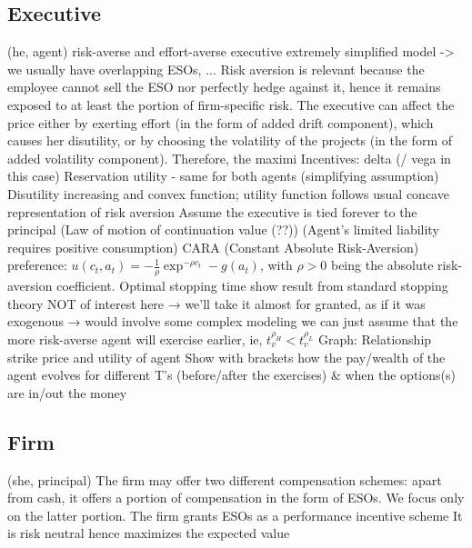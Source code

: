 \subsection{Executive}
(he, agent) risk-averse and effort-averse executive 
extremely simplified model -> we usually have overlapping ESOs, ...
Risk aversion is relevant because the employee cannot sell the ESO nor perfectly hedge against it, hence it remains exposed to at least the portion of firm-specific risk.
The executive can affect the price either by exerting effort (in the form of added drift component), which causes her disutility, or by choosing the volatility of the projects (in the form of added volatility component). Therefore, the maximi
Incentives: delta (/ vega in this case)
Reservation utility - same for both agents (simplifying assumption)
Disutility increasing and convex function; utility function follows usual concave representation of risk aversion
Assume the executive is tied forever to the principal
(Law of motion of continuation value (??))
(Agent's limited liability requires positive consumption)
CARA (Constant Absolute Risk-Aversion) preference: $u(c_t, a_t) = -\frac{1}{\rho} \exp^{-\rho c_t} - g(a_t)$, with $\rho>0$ being the absolute risk-aversion coefficient.
Optimal stopping time 
    show result from standard stopping theory
    NOT of interest here → we'll take it almost for granted, as if it was exogenous → would involve some complex modeling
    we can just assume that the more risk-averse agent will exercise earlier, ie, $t_v^{\rho_H} < t_v^{\rho_L}$
Graph: Relationship strike price and utility of agent
Show with brackets how the pay/wealth of the agent evolves for different T's (before/after the exercises) \& when the options(s) are in/out the money


\subsection{Firm}
(she, principal)
The firm may offer two different compensation schemes: apart from cash, it offers a portion of compensation in the form of ESOs. We focus only on the latter portion. The firm grants ESOs as a performance incentive scheme
It is risk neutral hence maximizes the expected value



